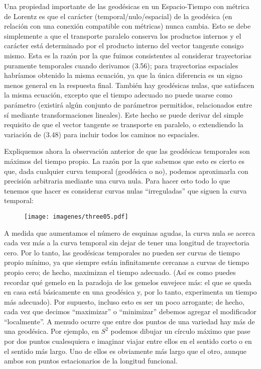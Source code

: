 \documentclass[11pt,b5paper,openany,twoside]{book}
\begin{document}
Una propiedad importante de las geodésicas en un Espacio-Tiempo con métrica de Lorentz es que el carácter (temporal/nulo/espacial) de la geodésica (en relación con una conexión compatible con métricas) nunca cambia.
Esto se debe simplemente a que el transporte paralelo conserva los productos internos y el carácter está determinado por el producto interno del vector tangente consigo mismo.
Esta es la razón por la que fuimos consistentes al considerar trayectorias puramente temporales cuando derivamos (3.56); para trayectorias espaciales habríamos obtenido la misma ecuación, ya que la única diferencia es un signo menos general en la respuesta final.
También hay geodésicas nulas, que satisfacen la misma ecuación, excepto que el tiempo adecuado no puede usarse como parámetro (existirá algún conjunto de parámetros permitidos, relacionados entre sí mediante transformaciones lineales).
Este hecho se puede derivar del simple requisito de que el vector tangente se transporte en paralelo, o extendiendo la variación de (3.48) para incluir todos los caminos no espaciales.

Expliquemos ahora la observación anterior de que las geodésicas temporales son máximos del tiempo propio.
La razón por la que sabemos que esto es cierto es que, dada cualquier curva temporal (geodésica o no), podemos aproximarla con precisión arbitraria mediante una curva nula.
Para hacer esto todo lo que tenemos que hacer es considerar curvas nulas ``irreguladas'' que siguen la curva temporal:

\begin{figure}[h]
\centering
\texttt{[image: imagenes/three05.pdf]}
\end{figure}

\noindent
A medida que aumentamos el número de esquinas agudas, la curva nula se acerca cada vez más a la curva temporal sin dejar de tener una longitud de trayectoria cero.
Por lo tanto, las geodésicas temporales no pueden ser curvas de tiempo propio mínimo, ya que siempre están infinitamente cercanas a curvas de tiempo propio cero; de hecho, maximizan el tiempo adecuado.
(Así es como puedes recordar qué gemelo en la paradoja de los gemelos envejece más: el que se queda en casa está básicamente en una geodésica y, por lo tanto, experimenta un tiempo más adecuado).
Por supuesto, incluso esto es ser un poco arrogante; de hecho, cada vez que decimos ``maximizar'' o ``minimizar'' debemos agregar el modificador ``localmente''. A menudo ocurre que entre dos puntos de una variedad hay más de una geodésica.
Por ejemplo, en $S^2$ podemos dibujar un círculo máximo que pase por dos puntos cualesquiera e imaginar viajar entre ellos en el sentido corto o en el sentido más largo.
Uno de ellos es obviamente más largo que el otro, aunque ambos son puntos estacionarios de la longitud funcional.
\end{document}
